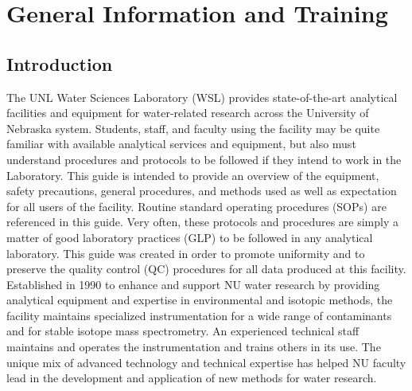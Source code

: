 \raggedright
\chapter{General Information and Training}

\section{Introduction}
The UNL Water Sciences Laboratory (WSL) provides state-of-the-art analytical facilities and equipment for water-related research across the University of Nebraska system. Students, staff, and faculty using the facility may be quite familiar with available analytical services and equipment, but also must understand procedures and protocols to be followed if they intend to work in the Laboratory. This guide is intended to provide an overview of the equipment, safety precautions, general procedures, and methods used as well as expectation for all users of the facility. Routine standard operating procedures (SOPs) are referenced in this guide. Very often, these protocols and procedures are simply a matter of good laboratory practices (GLP) to be followed in any analytical laboratory. This guide was created in order to promote uniformity and to preserve the quality control (QC) procedures for all data produced at this facility. Established in 1990 to enhance and support NU water research by providing analytical equipment and expertise in environmental and isotopic methods, the facility maintains specialized instrumentation for a wide range of contaminants and for stable isotope mass spectrometry. An experienced technical staff maintains and operates the instrumentation and trains others in its use. The unique mix of advanced technology and technical expertise has helped NU faculty lead in the development and application of new methods for water research. 

